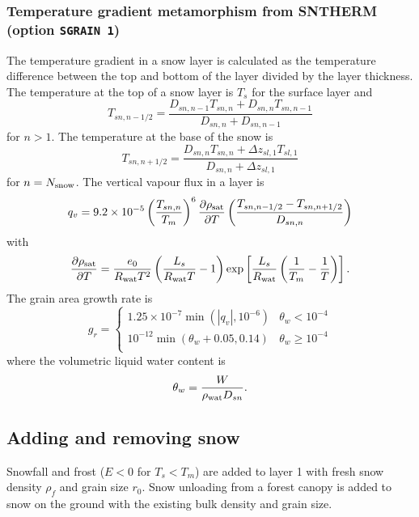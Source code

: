 \documentclass[fleqn]{article}
\begin{document}
\subsubsection{Temperature gradient metamorphism from SNTHERM (option {\tt SGRAIN 1})}
The temperature gradient in a snow layer is calculated as the temperature difference between the top and bottom of the layer divided by the layer thickness. The temperature at the top of a snow layer is $T_s$ for the surface layer and 
\begin{equation}
T_{sn,n-1/2} = \frac{D_{sn,n-1}T_{sn,n} + D_{sn,n} T_{sn,n-1}}{D_{sn,n} + D_{sn,n-1}}
\end{equation}
for $n>1$. The temperature at the base of the snow is
\begin{equation}
T_{sn,n+1/2} = \frac{D_{sn,n}T_{sn,n} + \Delta z_{sl,1} T_{sl,1}}{D_{sn,n} + \Delta z_{sl,1}}
\end{equation}
for $n = N_{\rm snow}$. The vertical vapour flux in a layer is
\begin{equation}
q_v = 9.2\times 10^{-5}\left(\frac{T_{sn,n}}{T_m}\right)^6 \frac{\partial\rho_{\rm sat}}{\partial T}
                       \left(\frac{T_{sn,n-1/2} - T_{sn,n+1/2}}{D_{sn,n}} \right)
\end{equation}
with
\begin{equation}
\frac{\partial\rho_{\rm sat}}{\partial T} = \frac{e_0}{R_{\rm wat} T^2}
\left(\frac{L_s}{R_{\rm wat} T} - 1 \right)
\exp\left[\frac{L_s}{R_{\rm wat}}\left(\frac{1}{T_m} - \frac{1}{T}\right)\right].
\end{equation}
The grain area growth rate is
\begin{equation}
g_r = 
\begin{cases}
    1.25\times 10^{-7}\min(|q_v|, 10^{-6})  & \theta_w < 10^{-4}    \\
    10^{-12}\min(\theta_w+0.05, 0.14)       & \theta_w \geq 10^{-4} \\
\end{cases}
\end{equation}
where the volumetric liquid water content is
\begin{equation}
\theta_w = \frac{W}{\rho_{\rm wat}D_{sn}}.
\end{equation} 

\subsection{Adding and removing snow}

Snowfall and frost ($E<0$ for $T_s<T_m$) are added to layer 1 with fresh snow density $\rho_f$ and grain size $r_0$. Snow unloading from a forest canopy is added to snow on the ground with the existing bulk density and grain size.
\end{document}
